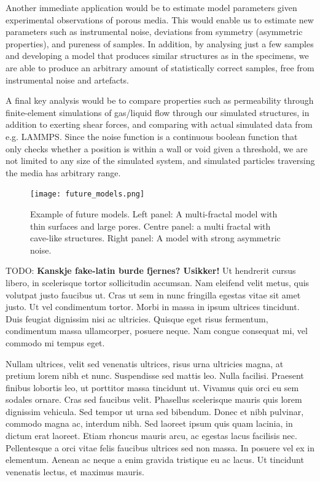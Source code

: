 \documentclass[aps,pre,twocolumn,letterpaper,floatfix,showpacs]{revtex4}
\newcommand{\todo}[1]{ {\color{Magenta} TODO: \color{Blue} \textbf{#1} }}
\begin{document}
Another immediate application would be to estimate model parameters given experimental observations of porous media. This would enable us to estimate new parameters such as instrumental noise, deviations from symmetry (asymmetric properties), and pureness of samples. In addition, by analysing just a few samples and developing a model that produces similar structures as in the specimens, we are able to produce an arbitrary amount of statistically correct samples, free from instrumental noise and artefacts. 

A final key analysis would be to compare properties such as permeability through finite-element simulations of gas/liquid flow through our simulated structures, in addition to exerting shear forces, and comparing with actual simulated data from e.g. LAMMPS. Since the noise function is a continuous boolean function that only checks whether a position is within a wall or void given a threshold, we are not limited to any size of the simulated system, and simulated particles traversing the media has arbitrary range.  




\begin{figure}
\texttt{[image: future\_models.png]}
\caption{Example of future models. Left panel: A multi-fractal model with thin surfaces and large pores. Centre panel: a multi fractal with cave-like structures. Right panel: A model with strong asymmetric noise. }
\label{fig:future_models}
\end{figure}

\todo{Kanskje fake-latin burde fjernes? Usikker!}
Ut hendrerit cursus libero, in scelerisque tortor sollicitudin accumsan. Nam eleifend velit metus, quis volutpat justo faucibus ut. Cras ut sem in nunc fringilla egestas vitae sit amet justo. Ut vel condimentum tortor. Morbi in massa in ipsum ultrices tincidunt. Duis feugiat dignissim nisi ac ultricies. Quisque eget risus fermentum, condimentum massa ullamcorper, posuere neque. Nam congue consequat mi, vel commodo mi tempus eget.

Nullam ultrices, velit sed venenatis ultrices, risus urna ultricies magna, at pretium lorem nibh et nunc. Suspendisse sed mattis leo. Nulla facilisi. Praesent finibus lobortis leo, ut porttitor massa tincidunt ut. Vivamus quis orci eu sem sodales ornare. Cras sed faucibus velit. Phasellus scelerisque mauris quis lorem dignissim vehicula. Sed tempor ut urna sed bibendum. Donec et nibh pulvinar, commodo magna ac, interdum nibh. Sed laoreet ipsum quis quam lacinia, in dictum erat laoreet. Etiam rhoncus mauris arcu, ac egestas lacus facilisis nec. Pellentesque a orci vitae felis faucibus ultrices sed non massa. In posuere vel ex in elementum. Aenean ac neque a enim gravida tristique eu ac lacus. Ut tincidunt venenatis lectus, et maximus mauris.
\end{document}
